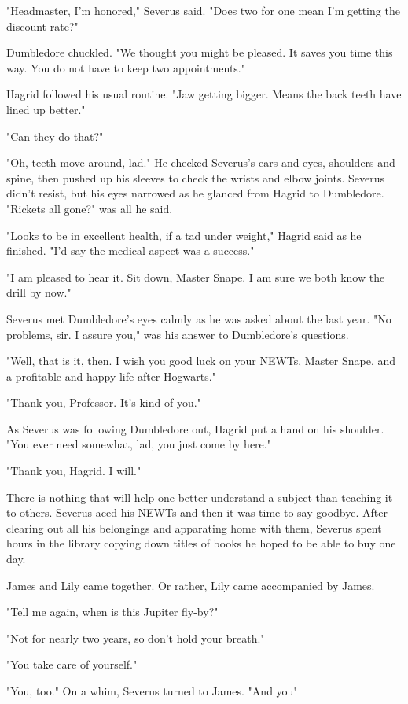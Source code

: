 "Headmaster, I'm honored," Severus said. "Does two for one mean I'm getting the discount rate?"

Dumbledore chuckled. "We thought you might be pleased. It saves you time this way. You do not have to keep two appointments."

Hagrid followed his usual routine. "Jaw getting bigger. Means the back teeth have lined up better."

"Can they do that?"

"Oh, teeth move around, lad." He checked Severus's ears and eyes, shoulders and spine, then pushed up his sleeves to check the wrists and elbow joints. Severus didn't resist, but his eyes narrowed as he glanced from Hagrid to Dumbledore. "Rickets all gone?" was all he said.

"Looks to be in excellent health, if a tad under weight," Hagrid said as he finished. "I'd say the medical aspect was a success."

"I am pleased to hear it. Sit down, Master Snape. I am sure we both know the drill by now."

Severus met Dumbledore's eyes calmly as he was asked about the last year. "No problems, sir. I assure you," was his answer to Dumbledore's questions.

"Well, that is it, then. I wish you good luck on your NEWTs, Master Snape, and a profitable and happy life after Hogwarts."

"Thank you, Professor. It's kind of you."

As Severus was following Dumbledore out, Hagrid put a hand on his shoulder. "You ever need somewhat, lad, you just come by here."

"Thank you, Hagrid. I will."

There is nothing that will help one better understand a subject than teaching it to others. Severus aced his NEWTs and then it was time to say goodbye. After clearing out all his belongings and apparating home with them, Severus spent hours in the library copying down titles of books he hoped to be able to buy one day.

James and Lily came together. Or rather, Lily came accompanied by James.

"Tell me again, when is this Jupiter fly-by?"

"Not for nearly two years, so don't hold your breath."

"You take care of yourself."

"You, too." On a whim, Severus turned to James. "And you{\el}"

